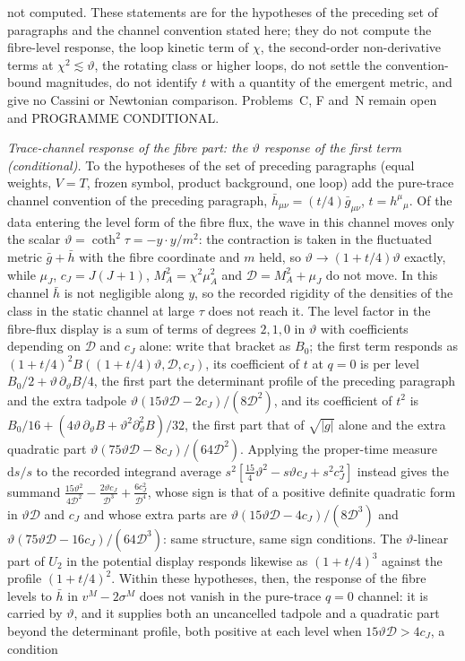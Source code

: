 not computed. These statements are for the hypotheses of the preceding set of paragraphs and the channel convention stated here; they do not compute the fibre-level response, the loop kinetic term of \(\chi\), the second-order non-derivative terms at \(\chi^2\lesssim\vartheta\), the rotating class or higher loops, do not settle the convention-bound magnitudes, do not identify \(t\) with a quantity of the emergent metric, and give no Cassini or Newtonian comparison. Problems~C, F and~N remain open and PROGRAMME CONDITIONAL.

\emph{Trace-channel response of the fibre part: the \(\vartheta\) response of the first term (conditional).} To the hypotheses of the set of preceding paragraphs (equal weights, \(V=T\), frozen symbol, product background, one loop) add the pure-trace channel convention of the preceding paragraph, \(\bar h_{\mu\nu}=(t/4)\bar g_{\mu\nu}\), \(t=h^\mu{}_\mu\). Of the data entering the level form of the fibre flux, the wave in this channel moves only the scalar \(\vartheta=\coth^2\tau=-y\cdot y/m^2\): the contraction is taken in the fluctuated metric \(\bar g+\bar h\) with the fibre coordinate and \(m\) held, so \(\vartheta\to(1+t/4)\vartheta\) exactly, while \(\mu_J\), \(c_J=J(J+1)\), \(M_A^2=\chi^2\mu_A^2\) and \(\mathcal D=M_A^2+\mu_J\) do not move. In this channel \(\bar h\) is not negligible along \(y\), so the recorded rigidity of the densities of the class in the static channel at large \(\tau\) does not reach it. The level factor in the fibre-flux display is a sum of terms of degrees \(2,1,0\) in \(\vartheta\) with coefficients depending on \(\mathcal D\) and \(c_J\) alone: write that bracket as \(B_0\); the first term responds as \((1+t/4)^2B((1+t/4)\vartheta,\mathcal D,c_J)\), its coefficient of \(t\) at \(q=0\) is per level \(B_0/2+\vartheta\,\partial_\vartheta B/4\), the first part the determinant profile of the preceding paragraph and the extra tadpole \(\vartheta(15\vartheta\mathcal D-2c_J)/(8\mathcal D^2)\), and its coefficient of \(t^2\) is \(B_0/16+(4\vartheta\,\partial_\vartheta B+\vartheta^2\partial_\vartheta^2B)/32\), the first part that of \(\sqrt{|g|}\) alone and the extra quadratic part \(\vartheta(75\vartheta\mathcal D-8c_J)/(64\mathcal D^2)\). Applying the proper-time measure \(\mathrm ds/s\) to the recorded integrand average \(s^2[\tfrac{15}4\vartheta^2-s\vartheta c_J+s^2c_J^2]\) instead gives the summand \(\tfrac{15\vartheta^2}{4\mathcal D^2}-\tfrac{2\vartheta c_J}{\mathcal D^3}+\tfrac{6c_J^2}{\mathcal D^4}\), whose sign is that of a positive definite quadratic form in \(\vartheta\mathcal D\) and \(c_J\) and whose extra parts are \(\vartheta(15\vartheta\mathcal D-4c_J)/(8\mathcal D^3)\) and \(\vartheta(75\vartheta\mathcal D-16c_J)/(64\mathcal D^3)\): same structure, same sign conditions. The \(\vartheta\)-linear part of \(U_2\) in the potential display responds likewise as \((1+t/4)^3\) against the profile \((1+t/4)^2\). Within these hypotheses, then, the response of the fibre levels to \(\bar h\) in \(v^M-2\sigma^M\) does not vanish in the pure-trace \(q=0\) channel: it is carried by \(\vartheta\), and it supplies both an uncancelled tadpole and a quadratic part beyond the determinant profile, both positive at each level when \(15\vartheta\mathcal D>4c_J\), a condition 